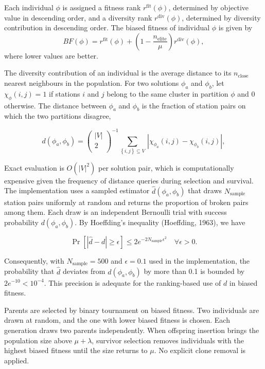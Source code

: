 \documentclass[11pt]{article}
\numberwithin{table}{section}
\numberwithin{figure}{section}
\begin{document}
Each individual $\phi$ is assigned a fitness rank $r^{\mathrm{fit}}(\phi)$, determined by objective value in descending order, and a diversity rank $r^{\mathrm{div}}(\phi)$, determined by diversity contribution in descending order. The biased fitness of individual $\phi$ is given by
\[
BF(\phi)=r^{\mathrm{fit}}(\phi)+\left(1-\frac{n_{\mathrm{elite}}}{\mu}\right)r^{\mathrm{div}}(\phi),
\]
where lower values are better.

The diversity contribution of an individual is the average distance to its ${{n}_{\text{close}}}$ nearest neighbours in the population. For two solutions ${{\phi }_{a}}$ and ${{\phi }_{b}}$, let ${{\chi }_{\phi }}\left( i,j \right)=1$ if stations $i$ and $j$ belong to the same cluster in partition $\phi $ and $0$ otherwise. The distance between ${{\phi }_{a}}$ and ${{\phi }_{b}}$ is the fraction of station pairs on which the two partitions disagree,

\[
d\left( {{\phi }_{a}},{{\phi }_{b}} \right)={{\left( \begin{matrix}
\left| V \right|  \\
2  \\
\end{matrix} \right)}^{-1}}\underset{\left\{ i,j \right\}\subseteq V}{\mathop \sum }\,\left| {{\chi }_{{{\phi }_{a}}}}\left( i,j \right)-{{\chi }_{{{\phi }_{b}}}}\left( i,j \right) \right|,
\]

Exact evaluation is $O\left( {{\left| V \right|}^{2}} \right)$ per solution pair, which is computationally expensive given the frequency of distance queries during selection and survival. The implementation uses a sampled estimator $\hat{d}\left( {{\phi }_{a}},{{\phi }_{b}} \right)$ that draws ${{N}_{\text{sample}}}$ station pairs uniformly at random and returns the proportion of broken pairs among them. Each draw is an independent Bernoulli trial with success probability $d({{\phi }_{a}},{{\phi }_{b}})$. By Hoeffding’s inequality (Hoeffding, 1963), we have

\[
\Pr [|\hat{d}-d|\ge \epsilon ]\le 2{{e}^{-2{{N}_{\text{sample}}}{{\epsilon }^{2}}}}\quad \forall \epsilon >0.
\]

Consequently, with ${{N}_{\text{sample}}}=500$ and $\mathsf{\epsilon }=0.1$ used in the implementation, the probability that $\hat{d}$ deviates from $d\left( {{\phi }_{a}},{{\phi }_{b}} \right)$ by more than 0.1 is bounded by $2{{e}^{-10}}<{{10}^{-4}}$. This precision is adequate for the ranking-based use of $d$ in biased fitness.

Parents are selected by binary tournament on biased fitness. Two individuals are drawn at random, and the one with lower biased fitness is chosen. Each generation draws two parents independently. When offspring insertion brings the population size above $\mu +\lambda $, survivor selection removes individuals with the highest biased fitness until the size returns to $\mu $. No explicit clone removal is applied.
\end{document}
